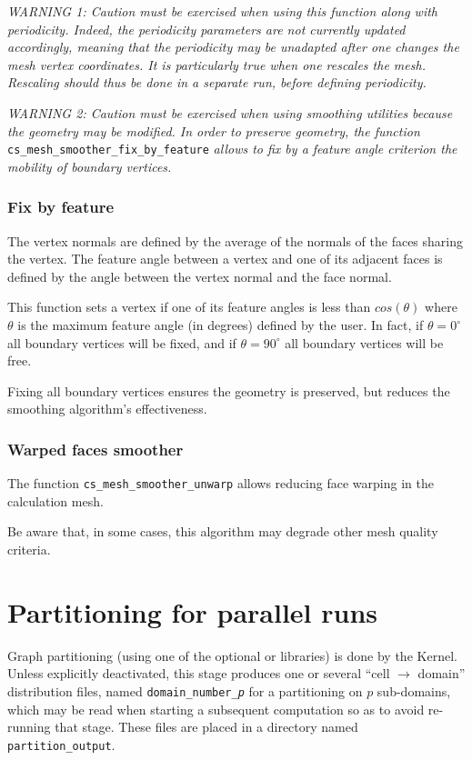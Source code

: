 {{{\em WARNING 1: Caution must be exercised when using this function
along with periodicity. Indeed, the periodicity parameters are not
currently updated accordingly, meaning that the periodicity may be
unadapted after one changes the mesh vertex coordinates. It is particularly
true when one rescales the mesh. Rescaling should thus be done
in a separate run, before defining periodicity.}

{\em WARNING 2: Caution must be exercised when using smoothing utilities
because the geometry may be modified. In order to preserve geometry,
the function} \texttt{cs\_mesh\_smoother\_fix\_by\_feature} {\em allows to
fix by a feature angle criterion the mobility of boundary vertices.}

\subsubsection{Fix by feature}
The vertex normals are defined by the average of the normals of the
faces sharing the vertex.
The feature angle between a vertex and one of its adjacent faces is defined
by the angle between the vertex normal and the face normal.

This function sets a vertex if one of its feature angles is less than
$cos(\theta)$ where $\theta$ is the maximum feature angle (in degrees)
defined by the user.
In fact, if $\theta = 0^{\circ}$ all boundary vertices will be fixed, and
if $\theta = 90^{\circ}$ all boundary vertices will be free.

Fixing all boundary vertices ensures the geometry is preserved, but reduces
the smoothing algorithm's effectiveness.

\subsubsection{Warped faces smoother}

The function \texttt{cs\_mesh\_smoother\_unwarp} allows reducing face warping
in the calculation mesh.

Be aware that, in some cases, this algorithm may degrade other mesh quality
criteria.

\section{Partitioning for parallel runs\label{sec:parall:part}}

Graph partitioning (using one of the optional \metis or
\scotch libraries) is done by the Kernel. Unless explicitly
deactivated, this stage produces one or several ``cell $\rightarrow$ domain''
distribution files, named {\tt domain\_number\_\it{p}} for a partitioning on
$p$ sub-domains, which may be read when starting a subsequent computation so as
to avoid re-running that stage. These files are placed in a directory named
{\tt partition\_output}.

}}
